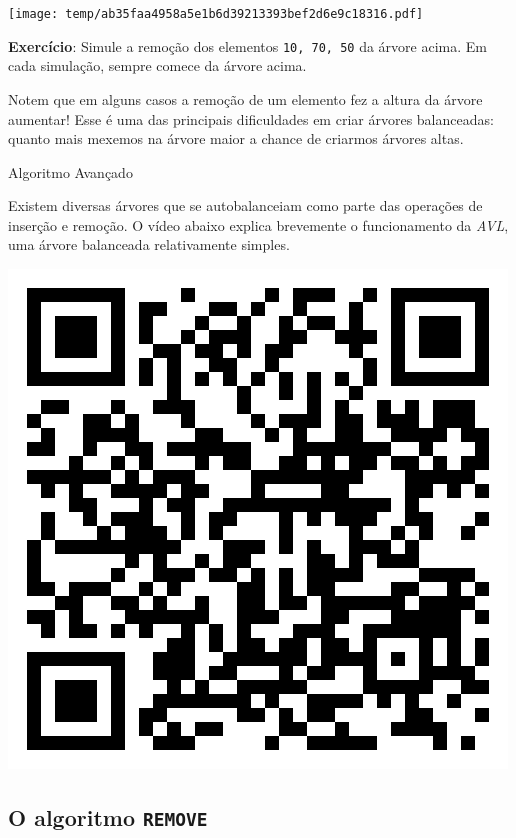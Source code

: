 \documentclass[]{article}
\begin{document}
\begin{adjustwidth}{0pt}{10em}
{\texttt{[image: temp/ab35faa4958a5e1b6d39213393bef2d6e9c18316.pdf]}

\par}

\textbf{Exercício}: Simule a remoção dos elementos \texttt{10,\ 70,\ 50}
da árvore acima. Em cada simulação, sempre comece da árvore acima.

\pagebreak

Notem que em alguns casos a remoção de um elemento fez a altura da
árvore aumentar! Esse é uma das principais dificuldades em criar árvores
balanceadas: quanto mais mexemos na árvore maior a chance de criarmos
árvores altas.

\begin{boxBlue}{Algoritmo Avançado}

Existem diversas árvores que se autobalanceiam como parte das operações
de inserção e remoção. O vídeo abaixo explica brevemente o funcionamento
da \emph{AVL}, uma árvore balanceada relativamente simples.

\includegraphics{qr-avl.png}

\end{boxBlue}

\subsection{\texorpdfstring{O algoritmo
\texttt{REMOVE}}{O algoritmo REMOVE}}\label{o-algoritmo-remove}


\end{adjustwidth}
\end{document}
